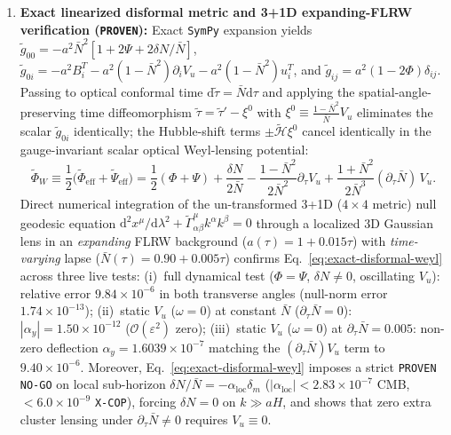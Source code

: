 \documentclass[11pt,a4paper]{article}
\begin{document}
\begin{enumerate}
    \item \textbf{Exact linearized disformal metric and 3+1D expanding-FLRW verification (\texttt{PROVEN}):}
    Exact \texttt{SymPy} expansion yields $\tilde{g}_{00} = -a^2\bar{N}^2[1 + 2\Psi + 2\delta N/\bar{N}]$, $\tilde{g}_{0i} = -a^2 B_i^T - a^2(1 - \bar{N}^2)\partial_i V_u - a^2(1-\bar{N}^2)u_i^T$, and $\tilde{g}_{ij} = a^2(1 - 2\Phi)\delta_{ij}$. Passing to optical conformal time $\mathrm{d}\tilde{\tau} = \bar{N}\mathrm{d}\tau$ and applying the spatial-angle-preserving time diffeomorphism $\tilde{\tau} = \tilde{\tau}' - \xi^0$ with $\xi^0 \equiv \frac{1 - \bar{N}^2}{\bar{N}} V_u$ eliminates the scalar $\tilde{g}_{0i}$ identically; the Hubble-shift terms $\pm\tilde{\mathcal{H}}\xi^0$ cancel identically in the gauge-invariant scalar optical Weyl-lensing potential:
    \begin{equation}
        \tilde{\Phi}_W \equiv \frac{1}{2}\bigl(\tilde{\Phi}_{\mathrm{eff}} + \tilde{\Psi}_{\mathrm{eff}}\bigr) = \frac{1}{2}(\Phi + \Psi) + \frac{\delta N}{2\bar{N}} - \frac{1 - \bar{N}^2}{2\bar{N}^2}\partial_\tau V_u + \frac{1 + \bar{N}^2}{2\bar{N}^3}(\partial_\tau\bar{N})\,V_u.
        \label{eq:exact-disformal-weyl}
    \end{equation}
    Direct numerical integration of the un-transformed 3+1D ($4\times 4$ metric) null geodesic equation $\mathrm{d}^2 x^\mu/\mathrm{d}\lambda^2 + \tilde{\Gamma}^\mu_{\alpha\beta} k^\alpha k^\beta = 0$ through a localized 3D Gaussian lens in an \emph{expanding} FLRW background ($a(\tau) = 1 + 0.015\tau$) with \emph{time-varying} lapse ($\bar{N}(\tau) = 0.90 + 0.005\tau$) confirms Eq.~\eqref{eq:exact-disformal-weyl} across three live tests: (i)~full dynamical test ($\Phi=\Psi$, $\delta N\ne 0$, oscillating $V_u$): relative error $9.84\times 10^{-6}$ in both transverse angles (null-norm error $1.74\times 10^{-13}$); (ii)~static $V_u$ ($\omega = 0$) at constant $\bar{N}$ ($\partial_\tau\bar{N} = 0$): $|\alpha_y| = 1.50\times 10^{-12}$ ($\mathcal{O}(\varepsilon^2)$ zero); (iii)~static $V_u$ ($\omega = 0$) at $\partial_\tau\bar{N} = 0.005$: non-zero deflection $\alpha_y = 1.6039\times 10^{-7}$ matching the $(\partial_\tau\bar{N})V_u$ term to $9.40\times 10^{-6}$. Moreover, Eq.~\eqref{eq:exact-disformal-weyl} imposes a strict \texttt{PROVEN NO-GO} on local sub-horizon $\delta N/\bar{N} = -\alpha_{\mathrm{loc}}\delta_m$ ($|\alpha_{\mathrm{loc}}| < 2.83\times 10^{-7}$ CMB, $< 6.0\times 10^{-9}$ \texttt{X-COP}), forcing $\delta N = 0$ on $k \gg aH$, and shows that zero extra cluster lensing under $\partial_\tau\bar{N}\ne 0$ requires $V_u \equiv 0$.

\end{enumerate}
\end{document}
